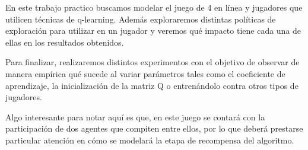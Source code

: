 En este trabajo practico buscamos modelar el juego de 4 en línea y jugadores que utilicen técnicas de q-learning. Además exploraremos distintas políticas de exploración para utilizar en un jugador y veremos qué impacto tiene cada una de ellas en los resultados obtenidos. 

Para finalizar, realizaremos distintos experimentos con el objetivo de observar de manera empírica qué sucede al variar parámetros tales como el coeficiente de aprendizaje, la inicialización de la matriz Q o entrenándolo contra otros tipos de jugadores.

Algo interesante para notar aquí es que, en este juego se contará con la participación de dos agentes que compiten entre ellos, por lo que deberá prestarse particular atención en cómo se modelará la etapa de recompensa del algoritmo.